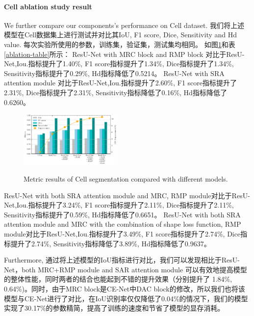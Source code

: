 \documentclass[UTF8]{article} %
\begin{document}
  \paragraph{Cell ablation study result}
  We further compare our components's performance on Cell dataset.
  我们将上述模型在Cell数据集上进行测试并对比其IoU, F1 score, Dice, Sensitivity and Hd value. 每次实验所使用的参数，训练集，验证集，测试集均相同。
  如图\ref{fig:cell_comparison}和表\ref{ablation-table}所示：
  ResU-Net with MRC block and RMP block 对比于ResU-Net,Iou.指标提升了1.40\%, F1 score指标提升了1.34\%, Dice指标提升了1.34\%, Sensitivity指标提升了0.29\%, Hd指标降低了0.5214。
  ResU-Net with SRA attention module 对比于ResU-Net,Iou.指标提升了2.60\%, F1 score指标提升了2.31\%, Dice指标提升了2.31\%, Sensitivity指标降低了0.16\%, Hd指标降低了0.6260。
  \begin{figure}[htbp]
    \begin{center}
    \includegraphics[width=0.45\textwidth]{figure/cell_comparison.pdf}
    \vspace{-2mm}
    \caption{Metric results of Cell segmentation compared with different models.} 
    \vspace{-2mm}
    \label{fig:cell_comparison}
    \end{center}
    \vspace{-0.35cm}
  \end{figure}
  ResU-Net with both SRA attention module and MRC, RMP module对比于ResU-Net,Iou.指标提升了3.24\%, F1 score指标提升了2.11\%, Dice指标提升了2.11\%, Sensitivity指标提升了0.59\%, Hd指标降低了0.6651。
  ResU-Net with both SRA attention module and MRC with the combination of shape loss function, 
  RMP module对比于ResU-Net,Iou.指标提升了3.49\%, F1 score指标提升了2.74\%, Dice指标提升了2.74\%, Sensitivity指标降低了3.89\%, Hd指标降低了0.9637。
  
  Furthermore, 通过将上述模型的IoU指标进行对比，我们可以发现相比于ResU-Net，both MRC+RMP module and SAR attention module 可以有效地提高模型的整体性能，同时两者的结合也能起到不错的提升效果（分别提升了
  1.84\%, 0.64\%)。同时，由于MRC block是CE-Net中DAC block的修改，所以我们也将该模型与CE-Net进行了对比，在IoU识别率仅仅降低了0.04\%的情况下，我们的模型实现了30.17\%的参数精简，提高了训练的速度和节省了模型的显存消耗。
\end{document}
